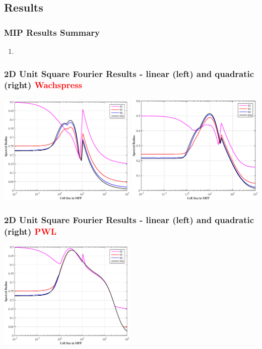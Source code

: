 \documentclass[compress,10pt]{beamer}
\newcommand{\tcr}[1]{\textcolor{red}{#1}}
\begin{document}
\subsection{Results}
\begin{frame}[t]\frametitle{MIP Results Summary}
\begin{block}{}
\begin{enumerate}
\item
\end{enumerate}
\end{block}
\end{frame}
\begin{frame}[t]
{
\frametitle{\small 2D Unit Square Fourier Results - linear (left) and quadratic (right) \tcr{Wachspress}}
\vspace{1cm}
\includegraphics[width=0.495\textwidth]{images/SI_MIP_quad_C=4_UWACHSPRESS1_LS.eps}
\includegraphics[width=0.495\textwidth]{images/SI_MIP_quad_C=4_UWACHSPRESS2_LS.eps}
}
{
\frametitle{\small 2D Unit Square Fourier Results - linear (left) and quadratic (right) \tcr{PWL}}
\vspace{1cm}
\includegraphics[width=0.495\textwidth]{images/SI_MIP_quad_C=4_PWLD1_LS.eps}
}
\end{frame}
\end{document}
